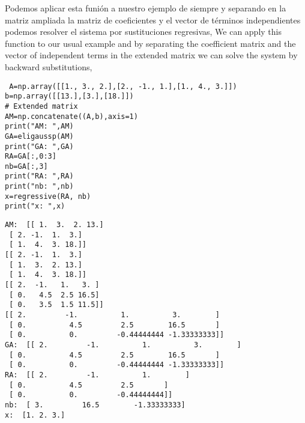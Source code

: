 \begin{paracol}{2}
   Podemos aplicar esta funión a nuestro ejemplo de siempre y separando en la matriz ampliada la matriz de coeficientes y el vector de términos independientes podemos resolver el sistema por sustituciones regresivas,
\switchcolumn
   We can apply this function to our usual example and by separating the coefficient matrix and the vector of independent terms in the extended matrix we can solve the system by backward substitutions,
\end{paracol}

\begin{verbatim}
 A=np.array([[1., 3., 2.],[2., -1., 1.],[1., 4., 3.]])
b=np.array([[13.],[3.],[18.]])
# Extended matrix
AM=np.concatenate((A,b),axis=1)
print("AM: ",AM)
GA=eligaussp(AM)
print("GA: ",GA)
RA=GA[:,0:3]
nb=GA[:,3]
print("RA: ",RA)
print("nb: ",nb)
x=regressive(RA, nb)
print("x: ",x)   
\end{verbatim}

\begin{verbatim}
AM:  [[ 1.  3.  2. 13.]
 [ 2. -1.  1.  3.]
 [ 1.  4.  3. 18.]]
[[ 2. -1.  1.  3.]
 [ 1.  3.  2. 13.]
 [ 1.  4.  3. 18.]]
[[ 2.  -1.   1.   3. ]
 [ 0.   4.5  2.5 16.5]
 [ 0.   3.5  1.5 11.5]]
[[ 2.         -1.          1.          3.        ]
 [ 0.          4.5         2.5        16.5       ]
 [ 0.          0.         -0.44444444 -1.33333333]]
GA:  [[ 2.         -1.          1.          3.        ]
 [ 0.          4.5         2.5        16.5       ]
 [ 0.          0.         -0.44444444 -1.33333333]]
RA:  [[ 2.         -1.          1.        ]
 [ 0.          4.5         2.5       ]
 [ 0.          0.         -0.44444444]]
nb:  [ 3.         16.5        -1.33333333]
x:  [1. 2. 3.]    
\end{verbatim}


